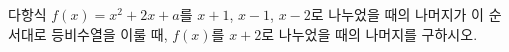 다항식 $f(x)=x^2+2x+a$를 $x+1$, $x-1$, $x-2$로 나누었을 때의 나머지가 이 순서대로 등비수열을 이룰 때, $f(x)$를 $x+2$로 나누었을 때의 나머지를 구하시오. 
